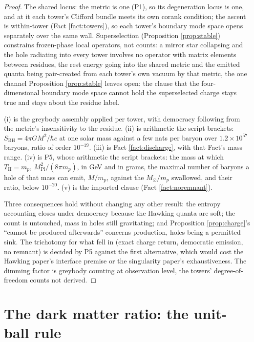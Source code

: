 \documentclass[11pt]{article}
\theoremstyle{definition}
\let\oldsection\section
\renewcommand{\section}{\clearpage\oldsection}   %
\begin{document}
\begin{proof}
The shared locus: the metric is one (P1), so its degeneration locus is one, and at it each tower's Clifford bundle meets its own corank condition; the ascent is within-tower (Fact \ref{fact:towers}), so each tower's boundary mode space opens separately over the same wall. Superselection (Proposition \ref{prop:stable}) constrains frozen-phase local operators, not counts: a mirror star collapsing and the hole radiating into every tower involves no operator with matrix elements between residues, the rest energy going into the shared metric and the emitted quanta being pair-created from each tower's own vacuum by that metric, the one channel Proposition \ref{prop:stable} leaves open; the clause that the four-dimensional boundary mode space cannot hold the superselected charge stays true and stays about the residue label.

(i) is the greybody assembly applied per tower, with democracy following from the metric's insensitivity to the residue. (ii) is arithmetic the script brackets: $S_{\mathrm{BH}} = 4\pi G M^{2}/\hbar c$ at one solar mass against a few nats per baryon over $1.2 \times 10^{57}$ baryons, ratio of order $10^{-19}$. (iii) is Fact \ref{fact:discharge}, with that Fact's mass range. (iv) is P5, whose arithmetic the script brackets: the mass at which $T_{\mathrm{H}} = m_{p}$, $M_{\mathrm{Pl}}^{2}/(8\pi m_{p})$, in GeV and in grams, the maximal number of baryons a hole of that mass can emit, $M/m_{p}$, against the $M_{\odot}/m_{p}$ swallowed, and their ratio, below $10^{-20}$. (v) is the imported clause (Fact \ref{fact:noremnant}).

Three consequences hold without changing any other result: the entropy accounting closes under democracy because the Hawking quanta are soft; the count is untouched, mass in holes still gravitating; and Proposition \ref{prop:charge}'s ``cannot be produced afterwards'' concerns production, holes being a permitted sink. The trichotomy for what fell in (exact charge return, democratic emission, no remnant) is decided by P5 against the first alternative, which would cost the Hawking paper's interface premise or the singularity paper's exhaustiveness. The dimming factor is greybody counting at observation level, the towers' degree-of-freedom counts not derived.
\end{proof}

\section{The dark matter ratio: the unit-ball rule}\label{sec:rule}
\end{document}
